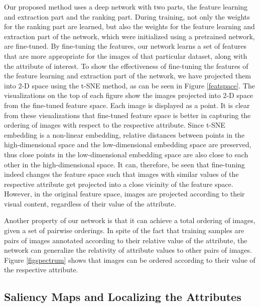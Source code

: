 Our proposed method uses a deep network with two parts, the feature learning and extraction part and the ranking part. During training, not only the weights for the ranking part are learned, but also the weights for the feature learning and extraction part of the network, which were initialized using a pretrained network, are fine-tuned. By fine-tuning the features, our network learns a set of features that are more appropriate for the images of that particular dataset, along with the attribute of interest. To show the effectiveness of fine-tuning the features of the feature learning and extraction part of the network, we have projected them into 2-D space using the t-SNE \cite{van2008visualizing} method, as can be seen in Figure \ref{featspace}. The visualizations on the top of each figure show the images projected into 2-D space from the fine-tuned feature space. Each image is displayed as a point. It is clear from these visualizations that fine-tuned feature space is better in capturing the ordering of images with respect to the respective attribute. Since t-SNE embedding is a non-linear embedding, relative distances between points in the high-dimensional space and the low-dimensional embedding space are preserved, thus close points in the low-dimensional embedding space are also close to each other in the high-dimensional space. It can, therefore, be seen that fine-tuning indeed changes the feature space such that images with similar values of the respective attribute get projected into a close vicinity of the feature space. However, in the original feature space, images are projected according to their visual content, regardless of their value of the attribute.

Another property of our network is that it can achieve a total ordering of images, given a set of pairwise orderings. In spite of the fact that training samples are pairs of images annotated according to their relative value of the attribute, the network can generalize the relativity of attribute values to other pairs of images. Figure \ref{figspectrum} shows that images can be ordered according to their value of the respective attribute. 

\subsection{Saliency Maps and Localizing the Attributes} \label{sec.4.5}

